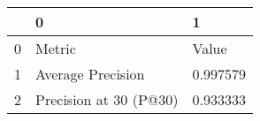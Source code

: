 \begin{tabular}{lll}
\toprule
{} &                       0 &         1 \\
\midrule
0 &                  Metric &     Value \\
1 &       Average Precision &  0.997579 \\
2 &  Precision at 30 (P@30) &  0.933333 \\
\bottomrule
\end{tabular}
